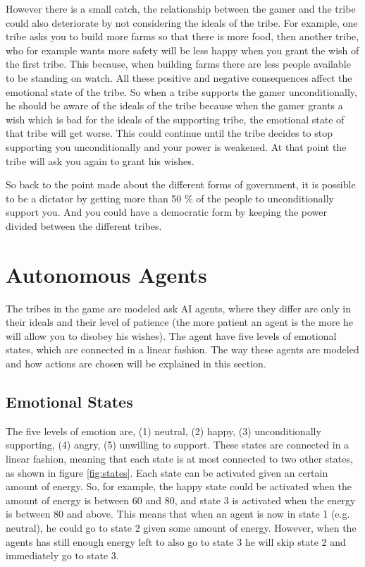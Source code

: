 \documentclass[11pt,a4paper]{article}
\begin{document}
However there is a small catch, the relationship between the gamer and the tribe could also deteriorate by not considering the ideals of the tribe. For example, one tribe asks you to build more farms so that there is more food, then another tribe, who for example wants more safety will be less happy when you grant the wish of the first tribe. This because, when building farms there are less people available to be standing on watch. All these positive and negative consequences affect the emotional state of the tribe. So when a tribe supports the gamer unconditionally, he should be aware of the ideals of the tribe because when the gamer grants a wish which is bad for the ideals of the supporting tribe, the emotional state of that tribe will get worse. This could continue until the tribe decides to stop supporting you unconditionally and your power is weakened. At that point the tribe will ask you again to grant his wishes.

So back to the point made about the different forms of government, it is possible to be a dictator by getting more than 50 \% of the people to unconditionally support you. And you could have a democratic form by keeping the power divided between the different tribes.

\section{Autonomous Agents}
\label{sec:aa}
The tribes in the game are modeled ask AI agents, where they differ are only in their ideals and their level of patience (the more patient an agent is the more he will allow you to disobey his wishes). The agent have five levels of emotional states, which are connected in a linear fashion. The way these agents are modeled and how actions are chosen will be explained in this section. 

\subsection{Emotional States}
The five levels of emotion are, (1) neutral, (2) happy, (3) unconditionally supporting, (4) angry, (5) unwilling to support. These states are connected in a linear fashion, meaning that each state is at most connected to two other states, as shown in figure \ref{fig:states}. Each state can be activated given an certain amount of energy. So, for example, the happy state could be activated when the amount of energy is between 60 and 80, and state 3 is activated when the energy is between 80 and above. This means that when an agent is now in state 1 (e.g. neutral), he could go to state 2 given some amount of energy. However, when the agents has still enough energy left to also go to state 3 he will skip state 2 and immediately go to state 3. 
\end{document}
